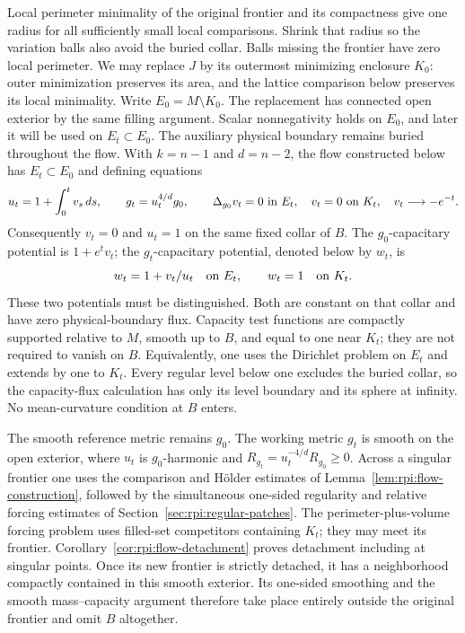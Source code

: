 Local perimeter minimality of the original frontier and its compactness
give one radius for all sufficiently small local comparisons. Shrink
that radius so the variation balls also avoid the buried collar.
Balls missing the frontier have zero local perimeter. We may replace
$J$ by its outermost minimizing enclosure $K_0$: outer minimization
preserves its area, and the lattice comparison below preserves its
local minimality. Write $E_0=M\setminus K_0$. The replacement has
connected open exterior by the same filling argument. Scalar
nonnegativity holds on $E_0$, and later it will be used on
$E_t\subset E_0$. The auxiliary physical boundary remains buried
throughout the flow.
With $k=n-1$ and $d=n-2$, the flow constructed below has $E_t\subset E_0$ and
defining equations
\[
 u_t=1+\int_0^t v_s\,ds,\qquad g_t=u_t^{4/d}g_0,
 \qquad \Delta_{g_0}v_t=0\ \hbox{in }E_t,
 \quad v_t=0\ \hbox{on }K_t,
 \quad v_t\longrightarrow-e^{-t}.
\]
Consequently $v_t=0$ and $u_t=1$ on the same fixed collar of $B$.
The $g_0$-capacitary potential is $1+e^t v_t$; the $g_t$-capacitary
potential, denoted below by $w_t$, is
\[
 w_t=1+v_t/u_t\quad\hbox{on }E_t,
 \qquad w_t=1\quad\hbox{on }K_t.
\]
These two potentials must be distinguished. Both are constant on that
collar and have zero physical-boundary flux. Capacity test functions
are compactly supported relative to $M$, smooth up to $B$, and equal
to one near $K_t$; they are not required to vanish on $B$. Equivalently,
one uses the Dirichlet problem on $E_t$ and extends by one to $K_t$.
Every regular level below one excludes the buried collar, so the
capacity-flux calculation has only its level boundary and its sphere
at infinity. No mean-curvature condition at $B$ enters.

The smooth reference metric remains $g_0$. The working metric $g_t$
is smooth on the open exterior, where $u_t$ is $g_0$-harmonic and
$R_{g_t}=u_t^{-4/d}R_{g_0}\geq0$. Across a singular frontier one uses
the comparison and H\"older estimates of
Lemma~\ref{lem:rpi:flow-construction}, followed by the simultaneous
one-sided regularity and relative forcing estimates of
Section~\ref{sec:rpi:regular-patches}. The perimeter-plus-volume forcing problem
uses filled-set competitors containing $K_t$; they may meet its
frontier. Corollary~\ref{cor:rpi:flow-detachment} proves detachment
including at singular points. Once
its new frontier is strictly detached, it has a neighborhood compactly
contained in this smooth exterior. Its one-sided smoothing and the
smooth mass--capacity argument therefore take place entirely outside
the original frontier and omit $B$ altogether.

